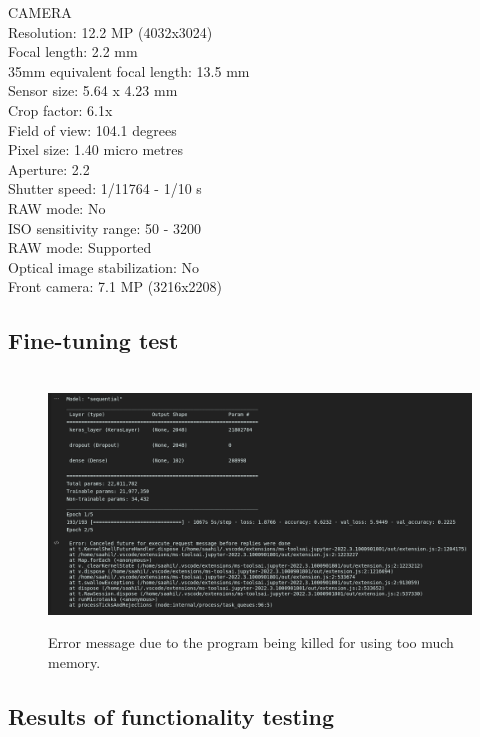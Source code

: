 \documentclass[12pt,a4paper]{report}
\begin{document}
\par

CAMERA \\
Resolution: 12.2 MP (4032x3024) \\
Focal length: 2.2 mm \\
35mm equivalent focal length: 13.5 mm \\
Sensor size: 5.64 x 4.23 mm \\ 
Crop factor: 6.1x \\
Field of view: 104.1 degrees \\
Pixel size: 1.40 micro metres \\
Aperture: 2.2 \\
Shutter speed: 1/11764 - 1/10 s \\
RAW mode: No \\
ISO sensitivity range: 50 - 3200 \\
RAW mode: Supported \\
Optical image stabilization: No \\
Front camera: 7.1 MP (3216x2208)

\subsection{Fine-tuning test}

\begin{figure}[h]\
    \centering
    \includegraphics[width=\textwidth]{Error_Trainable.png}
    \caption{Error message due to the program being killed for using too much memory.}
    \label{fig:finetuning}
\end{figure}

\subsection{Results of functionality testing}
\label{subsec:functionality}
\end{document}
